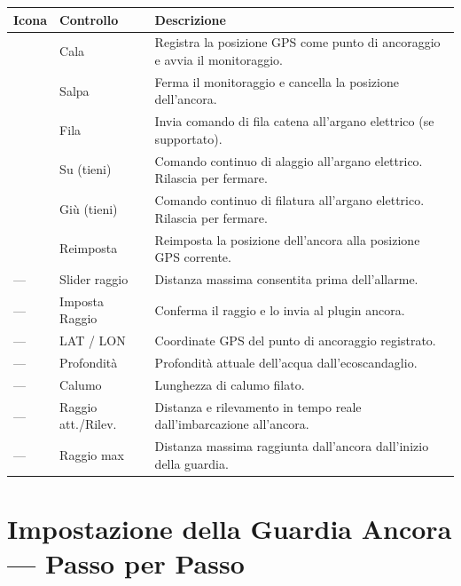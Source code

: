 \begin{longtable}{C{1.4cm}L{3.0cm}L{9.3cm}}
\toprule
{}
\color{white}\sffamily\bfseries Icona &
\color{white}\sffamily\bfseries Controllo &
\color{white}\sffamily\bfseries Descrizione \\
\midrule
{}    & Cala          & Registra la posizione GPS come punto di ancoraggio e avvia il monitoraggio. \\
   & Salpa         & Ferma il monitoraggio e cancella la posizione dell'ancora. \\
 & Fila          & Invia comando di fila catena all'argano elettrico (se supportato). \\
      & Su (tieni)    & Comando continuo di alaggio all'argano elettrico. Rilascia per fermare. \\
    & Giù (tieni)   & Comando continuo di filatura all'argano elettrico. Rilascia per fermare. \\
   & Reimposta     & Reimposta la posizione dell'ancora alla posizione GPS corrente. \\
---                      & Slider raggio & Distanza massima consentita prima dell'allarme. \\
---                      & Imposta Raggio & Conferma il raggio e lo invia al plugin ancora. \\
---                      & LAT / LON     & Coordinate GPS del punto di ancoraggio registrato. \\
---                      & Profondità    & Profondità attuale dell'acqua dall'ecoscandaglio. \\
---                      & Calumo        & Lunghezza di calumo filato. \\
---                      & Raggio att./Rilev. & Distanza e rilevamento in tempo reale dall'imbarcazione all'ancora. \\
---                      & Raggio max    & Distanza massima raggiunta dall'ancora dall'inizio della guardia. \\
\bottomrule
\end{longtable}

\section{Impostazione della Guardia Ancora --- Passo per Passo}

